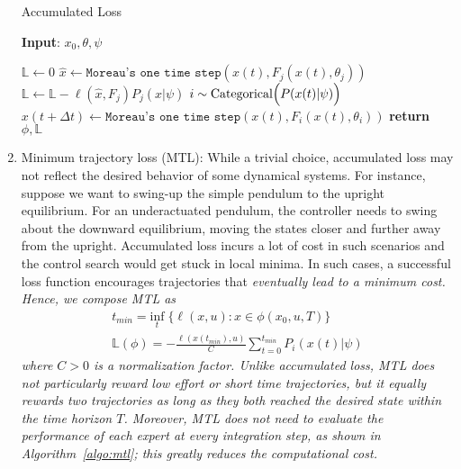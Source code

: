 \begin{enumerate}
    \begin{algorithm}[H]
        \caption{Accumulated Loss}
        \label{algo:accumulated_loss}
        \small
        \hspace*{\algorithmicindent} \textbf{Input}: $x_0, \theta, \psi$
        \begin{algorithmic}[1]
            \State $\mathbb{L} \leftarrow 0$
                    \State $\hat{x} \leftarrow \texttt{Moreau's one time step}(x(t), F_j(x(t), \theta_j))$
                    \State $\mathbb{L} \leftarrow \mathbb{L} - \ell(\hat{x}, F_j)P_j(\hat{x} | \psi)$
                \EndFor
                \State $i \sim \text{Categorical}\Bigl(P(x(t)| \psi)\Bigr)$ 
                \State $x(t + \Delta t) \leftarrow \texttt{Moreau's one time step}(x(t), F_i(x(t), \theta_i))$
                \EndFor
            \State \textbf{return} $\phi, \mathbb{L}$
        \end{algorithmic}
    \end{algorithm}
  
    \item Minimum trajectory loss (MTL): While a trivial choice, accumulated
    loss may not reflect the desired behavior of some dynamical systems.
    For instance, suppose we want to swing-up the simple pendulum to the upright
    equilibrium. 
    For an underactuated pendulum, the controller needs to swing about the
    downward equilibrium, moving the states closer and further away from the
    upright.
    Accumulated loss incurs a lot of cost in such scenarios and the control
    search would get stuck in local minima.
    In such cases, a successful loss function encourages trajectories that
    \it{eventually} \normalfont lead to a minimum cost.
    Hence, we compose MTL as
    \begin{equation}
        \begin{gathered}
            t_{min} = \underset{t}{\textrm{inf}} \; \{ \ell(x, u): x \in \phi(x_0, u, T) \}  \\
            \mathbb{L}(\phi) = - \frac{\ell(x(t_{min}), u)}{C} \sum_{t=0}^{t_{min}}P_i(x(t) | \psi) 
        \end{gathered} 
    \end{equation}
    \noindent where $C > 0$ is a normalization factor.
    Unlike accumulated loss, MTL does not particularly reward low effort or
    short time trajectories, but it equally rewards two trajectories
    as long as they both reached the desired state within the time horizon $T$. 
    Moreover, MTL does not need to evaluate the performance of each expert at
    every integration step, as shown in Algorithm~\eqref{algo:mtl}; this greatly
    reduces the computational cost.
    

\end{enumerate}
